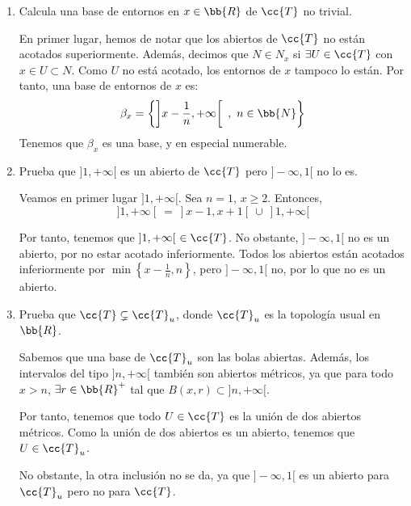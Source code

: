\begin{ejercicio}
\begin{enumerate}[label=\alph*)]
\begin{enumerate}
\begin{itemize}
                Por tanto, definimos $B_3=\left]z-\frac{1}{n_3}, z+\frac{1}{n_3}\right[ ~~\bigcup~~ ]n_3,+\infty[$, y tenemos que $z\in B_3$ y $B_3\subset B_1\cap B_2$.
            \end{itemize}
        \end{enumerate}

        \item Calcula una base de entornos en $x\in \bb{R}$ de $\cc{T}$ no trivial.

        En primer lugar, hemos de notar que los abiertos de $\cc{T}$ no están acotados superiormente. Además, decimos que $N\in N_x$ si $\exists U\in \cc{T}$ con $x\in U\subset N$. Como $U$ no está acotado, los entornos de $x$ tampoco lo están. Por tanto, una base de entornos de $x$ es:
        \begin{equation*}
            \beta_x=\left\{\left]x-\frac{1}{n}, +\infty \right[~,~n\in \bb{N}\right\}
        \end{equation*}
        Tenemos que $\beta_x$ es una base, y en especial numerable.

        \item Prueba que $]1,+\infty[$ es un abierto de $\cc{T}$ pero $]-\infty, 1[$ no lo es.

        Veamos en primer lugar $]1,+\infty[$. Sea $n=1$, $x\geq 2$. Entonces,
        \begin{equation*}
            ]1,+\infty[~=~]x-1, x+1[~\cup~]1,+\infty[ 
        \end{equation*}

        Por tanto, tenemos que $]1,+\infty[~\in  \cc{T}$. No obstante, $]-\infty, 1[$ no es un abierto, por no estar acotado inferiormente. Todos los abiertos están acotados inferiormente por $\min\left\{x-\frac{1}{n}, n\right\}$, pero $]-\infty, 1[$ no, por lo que no es un abierto.

        \item Prueba que $\cc{T}\subsetneq \cc{T}_u$, donde $\cc{T}_u$ es la topología usual en $\bb{R}$.

        Sabemos que una base de $\cc{T}_u$ son las bolas abiertas. Además, los intervalos del tipo $]n,+\infty[$ también son abiertos métricos, ya que para todo $x>n$, $\exists r\in \bb{R}^+$ tal que $B(x,r)\subset ]n,+\infty[$.

        Por tanto, tenemos que todo $U\in \cc{T}$ es la unión de dos abiertos métricos. Como la unión de dos abiertos es un abierto, tenemos que $U\in \cc{T}_u$.
        
        No obstante, la otra inclusión no se da, ya que $]-\infty, 1[$ es un abierto para $\cc{T}_u$ pero no para $\cc{T}$.


\end{enumerate}
\end{ejercicio}
